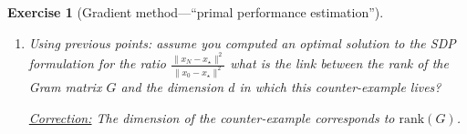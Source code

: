 \documentclass[11pt,a4paper]{article}
\newcommand{\correction}[1]{{{\color{blue}\underline{Correction:} #1}}}
\newcommand{\correction}[1]{}
\newtheorem{exercise}{Exercise}
\begin{document}
\begin{exercise}[Gradient method---``primal performance estimation'']
\begin{enumerate}
	\correction{ Following the same steps, we arrive to \begin{equation*}
		\begin{aligned}
		\sup_{\substack{d\\x_0,x_1,\ldots,x_{N},x_\star\\g_0,g_{1},\ldots,g_{N-1},g_\star\\f_k,f_{k+1},f_\star}} \quad & \|x_N-x_\star\|^2\\
		\text{s.t. } & \exists f\in\mathcal{F}_{\mu,L} \text{ such that }\left\{\begin{array}{ll}
			f_i=f(x_i)\quad & i=0,1,\ldots,N-1,\star\\
			g_i=\nabla f(x_i)\quad & i=0,1,\ldots,N-1,\star
			\end{array}\right.\\
		& x_{i+1}=x_i-\gamma_i  g_i \quad i=0,1,\ldots,N-1\\
		& \|x_0-x_\star\|^2= 1\\
		& g_\star=0.\\
		\end{aligned}
		\end{equation*}
	This formulation naturally translates to a $(N+1)\times (N+1)$ SDP with
			\begin{align*}
			P = [x_0-x_\star,\, g_0,\, g_1,\,\ldots,\,g_{N-1}]\\
			G \triangleq P^{\top\!}P\succcurlyeq0,\quad 	F \triangleq 			[f_0-f_\star,\, f_{1}-f_\star,\, f_{N-1}-f_\star].
			\end{align*}
	along with $N(N+1)$ interpolation inequalities (two inequalities per pair of points in the discrete representation).}
	
	\item Using previous points: assume you computed an optimal solution to the SDP formulation for the ratio $\frac{\|x_{N}-x_\star\|^2}{\|x_0-x_\star\|^2}$ what is the link between the rank of the Gram matrix $G$ and the dimension $d$ in which this counter-example lives? 
	
	\correction{The dimension of the counter-example corresponds to $\mathrm{rank}(G)$.}
	

\end{enumerate}
\end{exercise}
\end{document}
